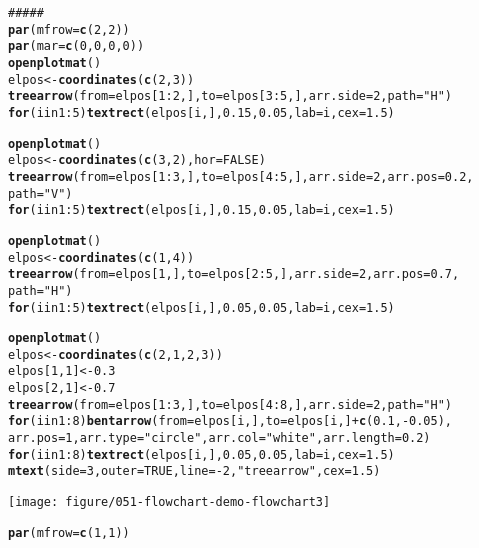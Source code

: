 \documentclass{article}\usepackage[]{graphicx}\usepackage[]{color}
\makeatletter
\def\maxwidth{ %
  \ifdim\Gin@nat@width>\linewidth
    \linewidth
  \else
    \Gin@nat@width
  \fi
}
\newcommand{\hlfunctioncall}[1]{\textcolor[rgb]{0.501960784313725,0,0.329411764705882}{\textbf{#1}}}%
\newcommand{\hlstring}[1]{\textcolor[rgb]{0.6,0.6,1}{#1}}%
\newcommand{\hlcomment}[1]{\textcolor[rgb]{0.180392156862745,0.6,0.341176470588235}{#1}}%
\newenvironment{kframe}{%
 \def\at@end@of@kframe{}%
 \ifinner\ifhmode%
  \def\at@end@of@kframe{\end{minipage}}%
  \begin{minipage}{\columnwidth}%
 \fi\fi%
 \def\FrameCommand##1{\hskip\@totalleftmargin \hskip-\fboxsep
 \colorbox{shadecolor}{##1}\hskip-\fboxsep
     \hskip-\linewidth \hskip-\@totalleftmargin \hskip\columnwidth}%
 \MakeFramed {\advance\hsize-\width
   \@totalleftmargin\z@ \linewidth\hsize
   \@setminipage}}%
 {\par\unskip\endMakeFramed%
 \at@end@of@kframe}
\newenvironment{knitrout}{}{} %
\makeatother
\begin{document}
\begin{knitrout}
\begin{kframe}
\begin{alltt}
\hlcomment{#####}
\hlfunctioncall{par}(mfrow = \hlfunctioncall{c}(2, 2))
\hlfunctioncall{par}(mar = \hlfunctioncall{c}(0, 0, 0, 0))
\hlfunctioncall{openplotmat}()
elpos <- \hlfunctioncall{coordinates}(\hlfunctioncall{c}(2, 3))
\hlfunctioncall{treearrow}(from = elpos[1:2, ], to = elpos[3:5, ], arr.side = 2, path = \hlstring{"H"})
\hlfunctioncall{for} (i in 1:5) \hlfunctioncall{textrect}(elpos[i, ], 0.15, 0.05, lab = i, cex = 1.5)

\hlfunctioncall{openplotmat}()
elpos <- \hlfunctioncall{coordinates}(\hlfunctioncall{c}(3, 2), hor = FALSE)
\hlfunctioncall{treearrow}(from = elpos[1:3, ], to = elpos[4:5, ], arr.side = 2, arr.pos = 0.2, 
    path = \hlstring{"V"})
\hlfunctioncall{for} (i in 1:5) \hlfunctioncall{textrect}(elpos[i, ], 0.15, 0.05, lab = i, cex = 1.5)

\hlfunctioncall{openplotmat}()
elpos <- \hlfunctioncall{coordinates}(\hlfunctioncall{c}(1, 4))
\hlfunctioncall{treearrow}(from = elpos[1, ], to = elpos[2:5, ], arr.side = 2, arr.pos = 0.7, 
    path = \hlstring{"H"})
\hlfunctioncall{for} (i in 1:5) \hlfunctioncall{textrect}(elpos[i, ], 0.05, 0.05, lab = i, cex = 1.5)

\hlfunctioncall{openplotmat}()
elpos <- \hlfunctioncall{coordinates}(\hlfunctioncall{c}(2, 1, 2, 3))
elpos[1, 1] <- 0.3
elpos[2, 1] <- 0.7
\hlfunctioncall{treearrow}(from = elpos[1:3, ], to = elpos[4:8, ], arr.side = 2, path = \hlstring{"H"})
\hlfunctioncall{for} (i in 1:8) \hlfunctioncall{bentarrow}(from = elpos[i, ], to = elpos[i, ] + \hlfunctioncall{c}(0.1, -0.05), 
    arr.pos = 1, arr.type = \hlstring{"circle"}, arr.col = \hlstring{"white"}, arr.length = 0.2)
\hlfunctioncall{for} (i in 1:8) \hlfunctioncall{textrect}(elpos[i, ], 0.05, 0.05, lab = i, cex = 1.5)
\hlfunctioncall{mtext}(side = 3, outer = TRUE, line = -2, \hlstring{"treearrow"}, cex = 1.5)
\end{alltt}
\end{kframe}
\texttt{[image: figure/051-flowchart-demo-flowchart3]} 
\begin{kframe}\begin{alltt}



\hlfunctioncall{par}(mfrow = \hlfunctioncall{c}(1, 1))


\end{alltt}
\end{kframe}
\end{knitrout}
\end{document}
